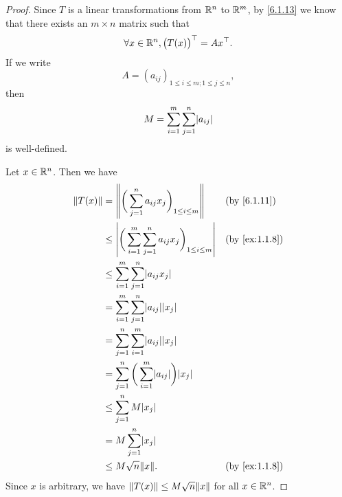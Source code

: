\begin{proof}
  Since \(T\) is a linear transformations from \(\mathbb{R}^n\) to \(\mathbb{R}^m\), by \cref{6.1.13} we know that there exists an \(m \times n\) matrix such that
  \[
    \forall x \in \mathbb{R}^n, \big(T(x)\big)^\top = Ax^\top.
  \]
  If we write
  \[
    A = (a_{ij})_{1 \leq i \leq m ; 1 \leq j \leq n},
  \]
  then
  \[
    M = \sum_{i = 1}^m \sum_{j = 1}^n \abs{a_{ij}}
  \]
  is well-defined.

  Let \(x \in \mathbb{R}^n\).
  Then we have
  \begin{align*}
    \norm*{T(x)} & = \norm*{\bigg(\sum_{j = 1}^n a_{ij} x_j\bigg)_{1 \leq i \leq m}}                 &  & \by{6.1.11}   \\
                 & \leq \abs{\bigg(\sum_{i = 1}^m \sum_{j = 1}^n a_{ij} x_j\bigg)_{1 \leq i \leq m}} &  & \by{ex:1.1.8} \\
                 & \leq \sum_{i = 1}^m \sum_{j = 1}^n \abs{a_{ij} x_j}                                                  \\
                 & = \sum_{i = 1}^m \sum_{j = 1}^n \abs{a_{ij}} \abs{x_j}                                               \\
                 & = \sum_{j = 1}^n \sum_{i = 1}^m \abs{a_{ij}} \abs{x_j}                                               \\
                 & = \sum_{j = 1}^n \bigg(\sum_{i = 1}^m \abs{a_{ij}}\bigg) \abs{x_j}                                   \\
                 & \leq \sum_{j = 1}^n M \abs{x_j}                                                                      \\
                 & = M \sum_{j = 1}^n \abs{x_j}                                                                         \\
                 & \leq M \sqrt{n} \norm*{x}.                                                        &  & \by{ex:1.1.8}
  \end{align*}
  Since \(x\) is arbitrary, we have \(\norm*{T(x)} \leq M \sqrt{n} \norm*{x}\) for all \(x \in \mathbb{R}^n\).


\end{proof}
